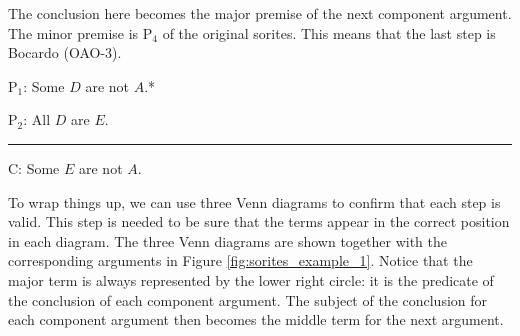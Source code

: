 {The conclusion here becomes the major premise of the next component argument. The minor premise is P$_4$ of the original sorites. This means that the last step is Bocardo (OAO-3). 

\begin{earg}
\item[P$_1$:] Some $D$ are not $A$.* 
\item[P$_2$:] All $D$ are $E$.
\vspace{-.5em}
\item [] \rule{0.2\linewidth}{.5pt} 
\item[C:] Some $E$ are not $A$. 
\end{earg} 

To wrap things up, we can use three Venn diagrams to confirm that each step is valid. This step is needed to be sure that the terms appear in the correct position in each diagram. The three Venn diagrams are shown together with the corresponding arguments in Figure \ref{fig:sorites_example_1}. Notice that the major term is always represented by the lower right circle: it is the predicate of the conclusion of each component argument. The subject of the conclusion for each component argument then becomes the middle term for the next argument. 

\begin{figure}
\begin{mdframed}[style=mytableclearbox]
\end{mdframed}
\end{figure}}
